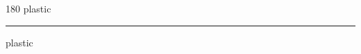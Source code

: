 
\begin{frame}
\begin{center}
\begin{turn}{180}
{\fontsize{2.5cm}{1em}\selectfont plastic}
\end{turn}
\vspace{1em}\par  
\hrule
\vspace{1em}\par  
{\fontsize{2.5cm}{1em}\selectfont plastic}
\end{center}
\end{frame}

